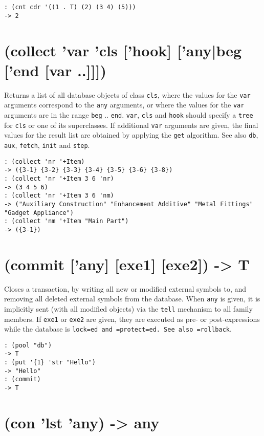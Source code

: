 {\begin{verbatim}
: (cnt cdr '((1 . T) (2) (3 4) (5)))
-> 2
\end{verbatim}

 
\section{(collect 'var 'cls ['hook] ['any|beg ['end [var ..]]])}
\label{sec-8-1-3-27}


Returns a list of all database objects of class \texttt{cls}, where the values
for the \texttt{var} arguments correspond to the \texttt{any} arguments, or where the
values for the \texttt{var} arguments are in the range \texttt{beg} .. \texttt{end}. \texttt{var},
\texttt{cls} and \texttt{hook} should specify a \texttt{tree} for \texttt{cls} or one of its
superclasses. If additional \texttt{var} arguments are given, the final values
for the result list are obtained by applying the \texttt{get} algorithm. See
also \texttt{db}, \texttt{aux}, \texttt{fetch}, \texttt{init} and \texttt{step}.


\begin{verbatim}
: (collect 'nr '+Item)
-> ({3-1} {3-2} {3-3} {3-4} {3-5} {3-6} {3-8})
: (collect 'nr '+Item 3 6 'nr)
-> (3 4 5 6)
: (collect 'nr '+Item 3 6 'nm)
-> ("Auxiliary Construction" "Enhancement Additive" "Metal Fittings" "Gadget Appliance")
: (collect 'nm '+Item "Main Part")
-> ({3-1})
\end{verbatim}

 
\section{(commit ['any] [exe1] [exe2]) -> T}
\label{sec-8-1-3-28}


Closes a transaction, by writing all new or modified external symbols
to, and removing all deleted external symbols from the database. When
\texttt{any} is given, it is implicitly sent (with all modified objects) via
the \texttt{tell} mechanism to all family members. If \texttt{exe1} or \texttt{exe2} are
given, they are executed as pre- or post-expressions while the database
is \texttt{lock=ed and =protect=ed. See also =rollback}.


\begin{verbatim}
: (pool "db")
-> T
: (put '{1} 'str "Hello")
-> "Hello"
: (commit)
-> T
\end{verbatim}

 
\section{(con 'lst 'any) -> any}
\label{sec-8-1-3-29}


}

